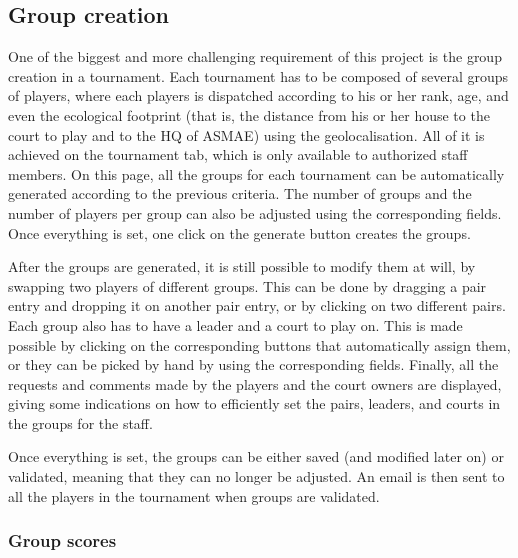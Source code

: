\subsection{Group creation}
\label{sub:Group creation}


One of the biggest and more challenging requirement of this project is the
group creation in a tournament. Each tournament has to be composed of
several groups of players, where each players is dispatched according to
his or her rank, age, and even the ecological footprint (that is, the distance
from his or her house to the court to play and to the HQ of ASMAE)
using the geolocalisation. All of it is achieved on the tournament tab, which is
only available to authorized staff members. On this page, all the
groups for each tournament can be automatically generated according to the
previous criteria. The number of groups and the number of players per group
can also be adjusted using the corresponding fields. Once everything is set,
one click on the generate button creates the groups. \newline

After the groups are generated, it is still possible to modify them at will, by
swapping two players of different groups. This can be done by dragging a pair
entry and dropping it on another pair entry, or by clicking on two different
pairs. Each group also has to have a leader and a court to play on.
This is made possible by clicking on the corresponding buttons that
automatically assign them, or they can be picked by hand by using the
corresponding fields. Finally, all the requests and comments made by the
players and the court owners are displayed, giving some indications on how
to efficiently set the pairs, leaders, and courts in the groups for the staff.
\newline

Once everything is set, the groups can be either saved (and modified later on)
or validated, meaning that they can no longer be adjusted. An email is then
sent to all the players in the tournament when groups are validated.

\subsubsection{Group scores}
\label{subs:Group scores}




